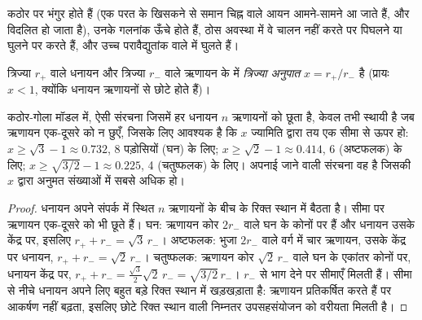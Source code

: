 \begin{proposition}[आयनिक क्रिस्टलों के गुण]\label{prop:b1:crystals-ionic-covalent:ionic-properties}
 कठोर पर भंगुर होते हैं (एक परत के खिसकने से समान चिह्न वाले आयन
आमने-सामने आ जाते हैं, और  विदलित हो जाता है), उनके गलनांक
ऊँचे होते हैं, ठोस अवस्था में वे चालन नहीं करते पर पिघलने या घुलने पर करते हैं,
और उच्च परावैद्युतांक वाले  में घुलते हैं।
\end{proposition}
\admitted

\begin{definition}[त्रिज्या अनुपात]\label{def:b1:crystals-ionic-covalent:radius-ratio}
त्रिज्या $r_+$ वाले धनायन और त्रिज्या
$r_-$ वाले ऋणायन के  में \emph{त्रिज्या अनुपात} $x = r_+/r_-$ है
(प्रायः $x < 1$, क्योंकि धनायन ऋणायनों से छोटे होते हैं)।
\end{definition}

\begin{proposition}[त्रिज्या-अनुपात नियम]\label{prop:b1:crystals-ionic-covalent:rule}
कठोर-गोला मॉडल में, ऐसी संरचना जिसमें हर धनायन $n$
ऋणायनों को छूता है, केवल तभी स्थायी है जब ऋणायन एक-दूसरे को न छुएँ, जिसके लिए
आवश्यक है कि $x$ ज्यामिति द्वारा तय एक सीमा से ऊपर हो: $x \ge \sqrt3 - 1
\approx 0.732$, 8 पड़ोसियों (घन) के लिए; $x \ge \sqrt2 - 1 \approx 0.414$,
6 (अष्टफलक) के लिए; $x \ge \sqrt{3/2} - 1 \approx 0.225$, 4
(चतुष्फलक) के लिए। अपनाई जाने वाली संरचना वह है जिसकी 
$x$ द्वारा अनुमत संख्याओं में सबसे अधिक हो।
\end{proposition}

\begin{proof}
धनायन अपने संपर्क में स्थित $n$ ऋणायनों के बीच के रिक्त स्थान में बैठता है। सीमा पर
ऋणायन एक-दूसरे को भी छूते हैं। घन: ऋणायन कोर $2r_-$ वाले घन के
कोनों पर हैं और धनायन उसके केंद्र पर, इसलिए $r_+ +
r_- = \sqrt3\,r_-$। अष्टफलक: भुजा $2r_-$ वाले वर्ग में चार ऋणायन,
उसके केंद्र पर धनायन, $r_+ + r_- = \sqrt2\,r_-$। चतुष्फलक:
ऋणायन कोर $\sqrt2\,r_-$ वाले घन के एकांतर कोनों पर, धनायन
केंद्र पर, $r_+ + r_- = \frac{\sqrt3}{2}\sqrt2\,r_- = \sqrt{3/2}\,r_-$।
$r_-$ से भाग देने पर सीमाएँ मिलती हैं। सीमा से नीचे धनायन अपने लिए बहुत बड़े
रिक्त स्थान में खड़खड़ाता है: ऋणायन प्रतिकर्षित करते हैं पर आकर्षण
नहीं बढ़ता, इसलिए छोटे रिक्त स्थान वाली निम्नतर उपसहसंयोजन को वरीयता मिलती है।
\end{proof}


